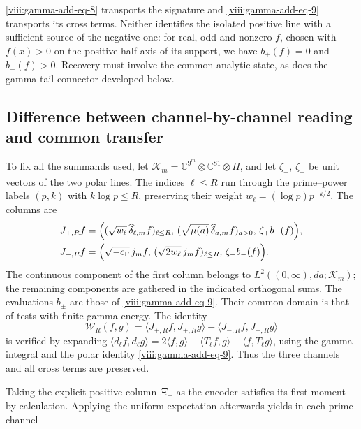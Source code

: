 \eqref{viii:gamma-add-eq-8} transports the signature and \eqref{viii:gamma-add-eq-9} transports its cross terms. Neither identifies the isolated positive line with a sufficient source of the negative one: for real, odd and nonzero \(f\), chosen with \(f(x)>0\) on the positive half-axis of its support, we have \(b_+(f)=0\) and \(b_-(f)>0\). Recovery must involve the common analytic state, as does the gamma-tail connector developed below.

\subsection{Difference between channel-by-channel reading and common transfer}
\label{viii:gamma-add-sub-259}

To fix all the summands used, let
\(\mathcal K_m=\mathbb C^{9^m}\otimes\mathbb C^{81}\otimes H\),
and let \(\zeta_+\), \(\zeta_-\) be unit vectors of the two
polar lines. The indices \(\ell\leq R\) run through the prime--power
labels \((p,k)\) with \(k\log p\leq R\), preserving
their weight \(w_\ell=(\log p)p^{-k/2}\). The columns are
\begin{equation}
\begin{aligned}
J_{+,R}f={}&\Bigl(
 (\sqrt{w_\ell}\,\widehat\delta_{\ell,m}f)_{\ell\leq R},\,
 (\sqrt{\mu(a)}\,\widehat\delta_{a,m}f)_{a>0},\,
 \zeta_+b_+(f)\Bigr),\\
J_{-,R}f={}&\Bigl(
 \sqrt{-c_\Gamma}\,j_mf,\,
 (\sqrt{2w_\ell}\,j_mf)_{\ell\leq R},\,
 \zeta_-b_-(f)\Bigr).
\end{aligned}
\label{viii:gamma-add-columnas-completas}
\end{equation}
The continuous component of the first column belongs to
\(L^2((0,\infty),da;\mathcal K_m)\); the remaining components
are gathered in the indicated orthogonal sums. The evaluations
\(b_\pm\) are those of \eqref{viii:gamma-add-eq-9}. Their common domain
is that of tests with finite gamma energy. The identity
\begin{equation}
\mathscr W_R(f,g)
=\langle J_{+,R}f,J_{+,R}g\rangle
 -\langle J_{-,R}f,J_{-,R}g\rangle
\label{viii:gamma-add-diferencia-columnas}
\end{equation}
is verified by expanding
\(\langle d_\ell f,d_\ell g\rangle
=2\langle f,g\rangle-\langle T_\ell f,g\rangle
-\langle f,T_\ell g\rangle\), using the gamma integral
and the polar identity \eqref{viii:gamma-add-eq-9}. Thus the three
channels and all cross terms are preserved.

Taking the explicit positive column \(\Xi_+\) as the encoder satisfies its first moment by calculation. Applying the uniform expectation afterwards yields in each prime channel

